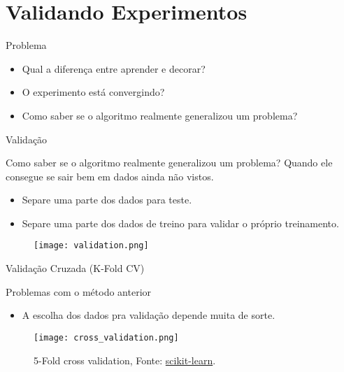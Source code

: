\section{Validando Experimentos}

\begin{frame}{Problema}
  \begin{itemize}
    \item Qual a diferença entre aprender e decorar?
    \item O experimento está convergindo?
    \item Como saber se o algoritmo realmente generalizou um problema?
  \end{itemize}
\end{frame}

\begin{frame}{Validação}
  \begin{block}{Como saber se o algoritmo realmente generalizou um problema?}
  Quando ele consegue se sair bem em dados ainda não vistos.
  \end{block}

  \pause

  \begin{itemize}
    \item Separe uma parte dos dados para teste.
    \item Separe uma parte dos dados de treino para validar o próprio treinamento.
  \end{itemize}

  \begin{figure}[t]
    \texttt{[image: validation.png]}
    \centering
  \end{figure}

\end{frame}

\begin{frame}{Validação Cruzada (K-Fold CV)}
  \begin{block}{Problemas com o método anterior}
    \begin{itemize}
      \item A escolha dos dados pra validação depende muita de sorte.
    \end{itemize}
  \end{block}

  \pause

  \begin{figure}[t]
    \texttt{[image: cross\_validation.png]}
    \caption{5-Fold cross validation, Fonte: \href{https://scikit-learn.org/stable/modules/cross_validation.html}{scikit-learn}.}
    \centering
  \end{figure}

\end{frame}

